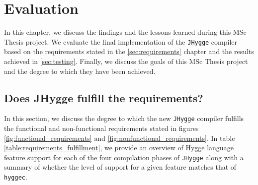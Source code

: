 \chapter{Evaluation}

In this chapter, we discuss the findings and the lessons learned during this MSc Thesis project. We evaluate the final implementation
of the \texttt{JHygge} compiler based on the requirements stated in the \ref{sec:requirements} chapter and the results achieved in
\ref{sec:testing}. Finally, we discuss the goals of this MSc Thesis project and the degree to which they have been achieved.

\section{Does JHygge fulfill the requirements?}

In this section, we discuss the degree to which the new \texttt{JHygge} compiler fulfills the functional and non-functional requirements
stated in figures \ref{fig:functional_requirements} and \ref{fig:nonfunctional_requirements}. In table \ref{table:requirements_fulfillment}, we provide an overview of Hygge language feature support for each of the four compilation phases of
\texttt{JHygge} along with a summary of whether the level of support for a given feature matches that of \texttt{hyggec}.

